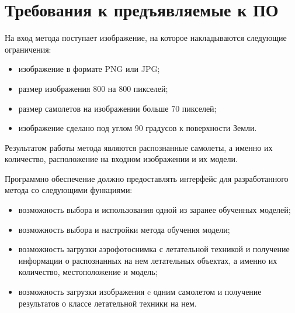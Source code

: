 \section{Требования к предъявляемые к ПО}
На вход метода поступает изображение, на которое накладываются следующие ограничения:
\begin{itemize}
	\item изображение в формате PNG или JPG;
	\item размер изображения 800 на 800 пикселей;
	\item размер самолетов на изображении больше 70 пикселей;
	\item изображение сделано под углом 90 градусов к поверхности Земли.
\end{itemize}

Результатом работы метода являются распознанные самолеты, а именно их количество, расположение на входном изображении и их модели.

Программно обеспечение должно предоставлять интерфейс для разработанного метода со следующими функциями:
\begin{itemize}
	\item возможность выбора и использования одной из заранее обученных моделей;
	\item возможность выбора и настройки метода обучения модели;
	\item возможность загрузки аэрофотоснимка с летательной техникой и получение информации о распознанных на нем летательных объектах, а именно их количество, местоположение и модель;
	\item возможность загрузки изображения c одним самолетом и получение результатов о классе летательной техники на нем.
\end{itemize}



